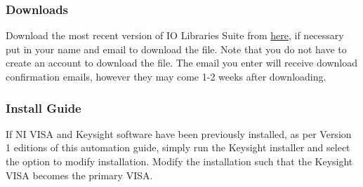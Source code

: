 \documentclass[11pt, letterpaper, titlepage]{article}
\begin{document}
\subsubsection{Downloads} %
Download the most recent version of IO Libraries Suite from \href{http://www.keysight.com/main/software.jspx?cc=CA&lc=eng&ckey=2175637&nid=-32516.426029&id=2175637}{here}, if necessary put in your name and email to download the file.
Note that you do not have to create an account to download the file.
The email you enter will receive download confirmation emails, however they may come 1-2 weeks after downloading.
\subsubsection{Install Guide} %
If NI VISA and Keysight software have been previously installed, as per Version 1 editions of this automation guide, simply run the Keysight installer and select the option to modify installation.
Modify the installation such that the Keysight VISA becomes the primary VISA.
\end{document}
